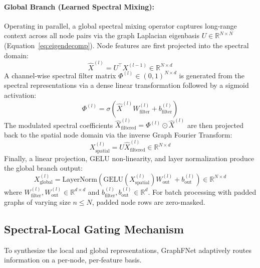 \documentclass[10pt]{article}
\begin{document}
\paragraph{Global Branch (Learned Spectral Mixing):} Operating in parallel, a global spectral mixing operator captures long-range context across all node pairs via the graph Laplacian eigenbasis $U \in \mathbb{R}^{N \times N}$ (Equation~\ref{eq:eigendecomp}). Node features are first projected into the spectral domain:
\begin{equation}
\hat{X}^{(l)} = U^\top X^{(l-1)} \in \mathbb{R}^{N \times d}
\end{equation}
A channel-wise spectral filter matrix $\Phi^{(l)} \in (0, 1)^{N \times d}$ is generated from the spectral representations via a dense linear transformation followed by a sigmoid activation:
\begin{equation}
\Phi^{(l)} = \sigma\left( \hat{X}^{(l)} W_{\text{filter}}^{(l)} + b_{\text{filter}}^{(l)} \right)
\end{equation}
The modulated spectral coefficients $\hat{X}_{\text{filtered}}^{(l)} = \Phi^{(l)} \odot \hat{X}^{(l)}$ are then projected back to the spatial node domain via the inverse Graph Fourier Transform:
\begin{equation}
X_{\text{spatial}}^{(l)} = U \hat{X}_{\text{filtered}}^{(l)} \in \mathbb{R}^{N \times d}
\end{equation}
Finally, a linear projection, GELU non-linearity, and layer normalization produce the global branch output:
\begin{equation}
X^{(l)}_{\text{global}} = \text{LayerNorm}\left( \text{GELU}\left( X_{\text{spatial}}^{(l)} \right) W_{\text{out}}^{(l)} + b_{\text{out}}^{(l)} \right) \in \mathbb{R}^{N \times d}
\end{equation}
where $W_{\text{filter}}^{(l)}, W_{\text{out}}^{(l)} \in \mathbb{R}^{d \times d}$ and $b_{\text{filter}}^{(l)}, b_{\text{out}}^{(l)} \in \mathbb{R}^d$. For batch processing with padded graphs of varying size $n \le N$, padded node rows are zero-masked.

\subsection{Spectral-Local Gating Mechanism}
To synthesize the local and global representations, GraphFNet adaptively routes information on a per-node, per-feature basis.
\end{document}
